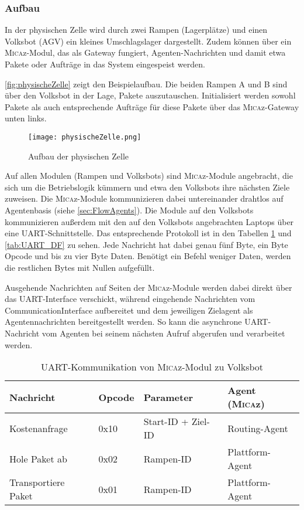 \subsubsection{Aufbau}
In der physischen Zelle wird durch zwei Rampen (Lagerplätze) und einen Volksbot (AGV) ein kleines Umschlagslager dargestellt. Zudem können über ein \textsc{Mica}z-Modul, das als Gateway fungiert, Agenten-Nachrichten und damit etwa Pakete oder Aufträge in das System eingespeist werden.

\autoref{fig:physischeZelle} zeigt den Beispielaufbau. Die beiden Rampen A und B sind über den Volksbot in der Lage, Pakete auszutauschen. Initialisiert werden sowohl Pakete als auch entsprechende Aufträge für diese Pakete über das \textsc{Mica}z-Gateway unten links.

\begin{figure}[h!]
	\centering
		\texttt{[image: physischeZelle.png]}
	\caption{Aufbau der physischen Zelle}
	\label{fig:physischeZelle}
\end{figure}

Auf allen Modulen (Rampen und Volksbots) sind \textsc{Mica}z-Module angebracht, die sich um die Betriebslogik kümmern und etwa den Volksbots ihre nächsten Ziele zuweisen. Die \textsc{Mica}z-Module kommunizieren dabei untereinander drahtlos auf Agentenbasis (siehe \autoref{sec:FlowAgents}). Die Module auf den Volksbots kommunizieren außerdem mit den auf den Volksbots angebrachten Laptops über eine UART-Schnittstelle. Das entsprechende Protokoll ist in den Tabellen \ref{tab:UART_FD} und \ref{tab:UART_DF} zu sehen. Jede Nachricht hat dabei genau fünf Byte, ein Byte Opcode und bis zu vier Byte Daten. Benötigt ein Befehl weniger Daten, werden die restlichen Bytes mit Nullen aufgefüllt.

Ausgehende Nachrichten auf Seiten der \textsc{Mica}z-Module werden dabei direkt über das UART-Interface verschickt, während eingehende Nachrichten vom CommunicationInterface aufbereitet und dem jeweiligen Zielagent als Agentennachrichten bereitgestellt werden. So kann die asynchrone UART-Nachricht vom Agenten bei seinem nächsten Aufruf abgerufen und verarbeitet werden.

\begin{table}[h!]
\centering
\begin{tabular}{| l | l | l | l |}
  \hline
  Nachricht & Opcode & Parameter & Agent (\textsc{Mica}z)\\
  \hline
  Kostenanfrage & 0x10 & Start-ID + Ziel-ID & Routing-Agent\\
  Hole Paket ab & 0x02 & Rampen-ID & Plattform-Agent\\
  Transportiere Paket & 0x01 & Rampen-ID & Plattform-Agent \\
  \hline
\end{tabular}
\caption{UART-Kommunikation von \textsc{Mica}z-Modul zu Volksbot}
\label{tab:UART_FD}
\end{table}

